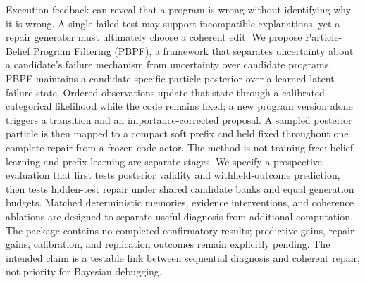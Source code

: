 Execution feedback can reveal that a program is wrong without identifying why it is wrong. A single failed test may support incompatible explanations, yet a repair generator must ultimately choose a coherent edit. We propose Particle-Belief Program Filtering (PBPF), a framework that separates uncertainty about a candidate's failure mechanism from uncertainty over candidate programs. PBPF maintains a candidate-specific particle posterior over a learned latent failure state. Ordered observations update that state through a calibrated categorical likelihood while the code remains fixed; a new program version alone triggers a transition and an importance-corrected proposal. A sampled posterior particle is then mapped to a compact soft prefix and held fixed throughout one complete repair from a frozen code actor. The method is not training-free: belief learning and prefix learning are separate stages. We specify a prospective evaluation that first tests posterior validity and withheld-outcome prediction, then tests hidden-test repair under shared candidate banks and equal generation budgets. Matched deterministic memories, evidence interventions, and coherence ablations are designed to separate useful diagnosis from additional computation. The package contains no completed confirmatory results; predictive gains, repair gains, calibration, and replication outcomes remain explicitly pending. The intended claim is a testable link between sequential diagnosis and coherent repair, not priority for Bayesian debugging.

